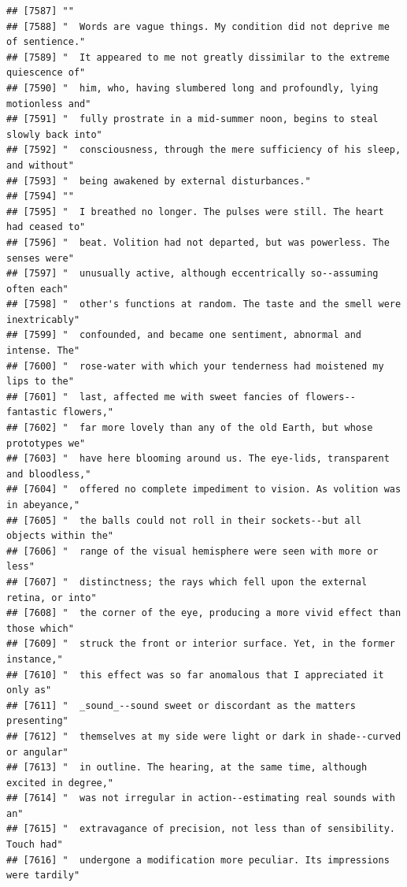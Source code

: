 \documentclass{article}\usepackage[]{graphicx}\usepackage[]{color}
\makeatletter
\newenvironment{kframe}{%
 \def\at@end@of@kframe{}%
 \ifinner\ifhmode%
  \def\at@end@of@kframe{\end{minipage}}%
  \begin{minipage}{\columnwidth}%
 \fi\fi%
 \def\FrameCommand##1{\hskip\@totalleftmargin \hskip-\fboxsep
 \colorbox{shadecolor}{##1}\hskip-\fboxsep
     \hskip-\linewidth \hskip-\@totalleftmargin \hskip\columnwidth}%
 \MakeFramed {\advance\hsize-\width
   \@totalleftmargin\z@ \linewidth\hsize
   \@setminipage}}%
 {\par\unskip\endMakeFramed%
 \at@end@of@kframe}
\newenvironment{knitrout}{}{} %
\makeatother
\begin{document}
\begin{knitrout}
\begin{kframe}
\begin{verbatim}
## [7587] ""                                                                            
## [7588] "  Words are vague things. My condition did not deprive me of sentience."     
## [7589] "  It appeared to me not greatly dissimilar to the extreme quiescence of"     
## [7590] "  him, who, having slumbered long and profoundly, lying motionless and"      
## [7591] "  fully prostrate in a mid-summer noon, begins to steal slowly back into"    
## [7592] "  consciousness, through the mere sufficiency of his sleep, and without"     
## [7593] "  being awakened by external disturbances."                                  
## [7594] ""                                                                            
## [7595] "  I breathed no longer. The pulses were still. The heart had ceased to"      
## [7596] "  beat. Volition had not departed, but was powerless. The senses were"       
## [7597] "  unusually active, although eccentrically so--assuming often each"          
## [7598] "  other's functions at random. The taste and the smell were inextricably"    
## [7599] "  confounded, and became one sentiment, abnormal and intense. The"           
## [7600] "  rose-water with which your tenderness had moistened my lips to the"        
## [7601] "  last, affected me with sweet fancies of flowers--fantastic flowers,"       
## [7602] "  far more lovely than any of the old Earth, but whose prototypes we"        
## [7603] "  have here blooming around us. The eye-lids, transparent and bloodless,"    
## [7604] "  offered no complete impediment to vision. As volition was in abeyance,"    
## [7605] "  the balls could not roll in their sockets--but all objects within the"     
## [7606] "  range of the visual hemisphere were seen with more or less"                
## [7607] "  distinctness; the rays which fell upon the external retina, or into"       
## [7608] "  the corner of the eye, producing a more vivid effect than those which"     
## [7609] "  struck the front or interior surface. Yet, in the former instance,"        
## [7610] "  this effect was so far anomalous that I appreciated it only as"            
## [7611] "  _sound_--sound sweet or discordant as the matters presenting"              
## [7612] "  themselves at my side were light or dark in shade--curved or angular"      
## [7613] "  in outline. The hearing, at the same time, although excited in degree,"    
## [7614] "  was not irregular in action--estimating real sounds with an"               
## [7615] "  extravagance of precision, not less than of sensibility. Touch had"        
## [7616] "  undergone a modification more peculiar. Its impressions were tardily"      

\end{verbatim}
\end{kframe}
\end{knitrout}
\end{document}
